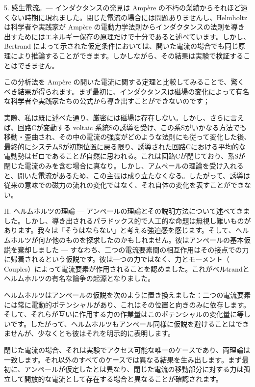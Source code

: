 \documentclass[a4paper,11pt,openany]{ltjsbook}
\begin{document}
5. 感生電流。— インダクタンスの発見は Ampère の不朽の業績からそれほど遠くない時期に現れました。閉じた電流の場合には問題ありませんし、Helmholtz は科学者や実践家が Ampère の電動力学法則からインダクタンスの法則を導き出すためにはエネルギー保存の原理だけで十分であると述べています。しかし、Bertrand によって示された仮定条件においては、開いた電流の場合でも同じ原理により推論することができます。しかしながら、その結果は実験で検証することはできません。

この分析法を Ampère の開いた電流に関する定理と比較してみることで、驚くべき結果が得られます。まず最初に、インダクタンスは磁場の変化によって有名な科学者や実践家たちの公式から導き出すことができないのです；


実際、私は既に述べた通り、厳密には磁場は存在しない。しかし、さらに言えば、回路Cが変動する voltaic 系統Sの誘導を受け、この系Sがいかなる方法でも移動・歪曲され、その中の電流の強度がどのような法則にも従って変化した後、最終的にシステムSが初期位置に戻る限り、誘導された回路Cにおける平均的な電動勢はゼロであることが自然に思われる。これは回路Cが閉じており、系Sが閉じた電流のみを含む場合に真なり。しかし、アムペールの理論を受け入れると、開いた電流があるため、この主張は成り立たなくなる。したがって、誘導は従来の意味での磁力の流れの変化ではなく、それ自体の変化を表すことができない。

II. ヘルムホルツの理論 — アンペールの理論とその説明方法について述べてきました。しかし、導き出されるパラドックス的で人工的な命題は無視し難いものがあります。我々は「そうはならない」と考える強迫感を感じます。そして、ヘルムホルツが何か他のものを探求したのかもしれません。彼はアンペールの基本仮説を棄却しました — すなわち、二つの電流要素間の相互作用はその接点での力に帰着されるという仮説です。彼は一つの力ではなく、力とモーメント（ Couples）によって電流要素が作用されることを認めました。これがベルtrandとヘルムホルツの有名な論争の起源となりました。

ヘルムホルツはアンペールの仮説を次のように置き換えました：二つの電流要素には常に電動的ポテンシャルがあり、これはその位置と向きのみに依存します。そして、それらが互いに作用する力の作業量はこのポテンシャルの変化量に等しいです。したがって、ヘルムホルツもアンペール同様に仮説を避けることはできませんが、少なくとも彼はそれを明示的に表明します。

閉じた電流の場合、それは実験でアクセス可能な唯一のケースであり、両理論は一致します。それ以外のすべてのケースでは異なる結果を生み出します。まず最初に、アンペールが仮定したとは異なり、閉じた電流の移動部分に対する力は孤立して開放的な電流として存在する場合と異なることが確認されます。
\end{document}
